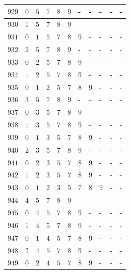 \begin{appendices}
\begin{table}[H]
\begin{tabular} {|l|l|l|l|l|l|l|l|l|l|l|}
  		$ 929 $ & $ 0 $ &$ 5 $ &$ 7 $ &$ 8 $ &$ 9 $ & - &  - &  - &  - &  -   \\ \hline
  		$ 930 $ & $ 1 $ &$ 5 $ &$ 7 $ &$ 8 $ &$ 9 $ & - &  - &  - &  - &  -   \\ \hline
  		$ 931 $ & $ 0 $ &$ 1 $ &$ 5 $ &$ 7 $ &$ 8 $ &$ 9 $ & - &  - &  - &  -   \\ \hline
  		$ 932 $ & $ 2 $ &$ 5 $ &$ 7 $ &$ 8 $ &$ 9 $ & - &  - &  - &  - &  -   \\ \hline
  		$ 933 $ & $ 0 $ &$ 2 $ &$ 5 $ &$ 7 $ &$ 8 $ &$ 9 $ & - &  - &  - &  -   \\ \hline
  		$ 934 $ & $ 1 $ &$ 2 $ &$ 5 $ &$ 7 $ &$ 8 $ &$ 9 $ & - &  - &  - &  -   \\ \hline
  		$ 935 $ & $ 0 $ &$ 1 $ &$ 2 $ &$ 5 $ &$ 7 $ &$ 8 $ &$ 9 $ & - &  - &  -   \\ \hline
  		$ 936 $ & $ 3 $ &$ 5 $ &$ 7 $ &$ 8 $ &$ 9 $ & - &  - &  - &  - &  -   \\ \hline
  		$ 937 $ & $ 0 $ &$ 3 $ &$ 5 $ &$ 7 $ &$ 8 $ &$ 9 $ & - &  - &  - &  -   \\ \hline
  		$ 938 $ & $ 1 $ &$ 3 $ &$ 5 $ &$ 7 $ &$ 8 $ &$ 9 $ & - &  - &  - &  -   \\ \hline
  		$ 939 $ & $ 0 $ &$ 1 $ &$ 3 $ &$ 5 $ &$ 7 $ &$ 8 $ &$ 9 $ & - &  - &  -   \\ \hline
  		$ 940 $ & $ 2 $ &$ 3 $ &$ 5 $ &$ 7 $ &$ 8 $ &$ 9 $ & - &  - &  - &  -   \\ \hline
  		$ 941 $ & $ 0 $ &$ 2 $ &$ 3 $ &$ 5 $ &$ 7 $ &$ 8 $ &$ 9 $ & - &  - &  -   \\ \hline
  		$ 942 $ & $ 1 $ &$ 2 $ &$ 3 $ &$ 5 $ &$ 7 $ &$ 8 $ &$ 9 $ & - &  - &  -   \\ \hline
  		$ 943 $ & $ 0 $ &$ 1 $ &$ 2 $ &$ 3 $ &$ 5 $ &$ 7 $ &$ 8 $ &$ 9 $ & - &  -   \\ \hline
  		$ 944 $ & $ 4 $ &$ 5 $ &$ 7 $ &$ 8 $ &$ 9 $ & - &  - &  - &  - &  -   \\ \hline
  		$ 945 $ & $ 0 $ &$ 4 $ &$ 5 $ &$ 7 $ &$ 8 $ &$ 9 $ & - &  - &  - &  -   \\ \hline
  		$ 946 $ & $ 1 $ &$ 4 $ &$ 5 $ &$ 7 $ &$ 8 $ &$ 9 $ & - &  - &  - &  -   \\ \hline
  		$ 947 $ & $ 0 $ &$ 1 $ &$ 4 $ &$ 5 $ &$ 7 $ &$ 8 $ &$ 9 $ & - &  - &  -   \\ \hline
  		$ 948 $ & $ 2 $ &$ 4 $ &$ 5 $ &$ 7 $ &$ 8 $ &$ 9 $ & - &  - &  - &  -   \\ \hline
  		$ 949 $ & $ 0 $ &$ 2 $ &$ 4 $ &$ 5 $ &$ 7 $ &$ 8 $ &$ 9 $ & - &  - &  -   \\ \hline

\end{tabular}
\end{table}
\end{appendices}
